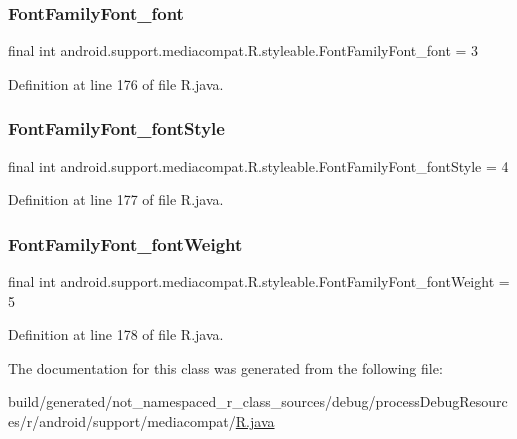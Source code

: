 \subsubsection{\texorpdfstring{FontFamilyFont\_font}{FontFamilyFont\_font}}
{\footnotesize\ttfamily final int android.\+support.\+mediacompat.\+R.\+styleable.\+Font\+Family\+Font\+\_\+font = 3\hspace{0.3cm}{\ttfamily [static]}}



Definition at line 176 of file R.\+java.

\mbox{\label{classandroid_1_1support_1_1mediacompat_1_1_r_1_1styleable_aba1bc730695a4e66ef6cb7945eb8ea1b}} 
\subsubsection{\texorpdfstring{FontFamilyFont\_fontStyle}{FontFamilyFont\_fontStyle}}
{\footnotesize\ttfamily final int android.\+support.\+mediacompat.\+R.\+styleable.\+Font\+Family\+Font\+\_\+font\+Style = 4\hspace{0.3cm}{\ttfamily [static]}}



Definition at line 177 of file R.\+java.

\mbox{\label{classandroid_1_1support_1_1mediacompat_1_1_r_1_1styleable_a3e4dffd2fc80e148b73a70308ab7c0a7}} 
\subsubsection{\texorpdfstring{FontFamilyFont\_fontWeight}{FontFamilyFont\_fontWeight}}
{\footnotesize\ttfamily final int android.\+support.\+mediacompat.\+R.\+styleable.\+Font\+Family\+Font\+\_\+font\+Weight = 5\hspace{0.3cm}{\ttfamily [static]}}



Definition at line 178 of file R.\+java.



The documentation for this class was generated from the following file\+:\begin{DoxyCompactItemize}
\item 
build/generated/not\+\_\+namespaced\+\_\+r\+\_\+class\+\_\+sources/debug/process\+Debug\+Resources/r/android/support/mediacompat/\mbox{\hyperlink{android_2support_2mediacompat_2_r_8java}{R.\+java}}\end{DoxyCompactItemize}
